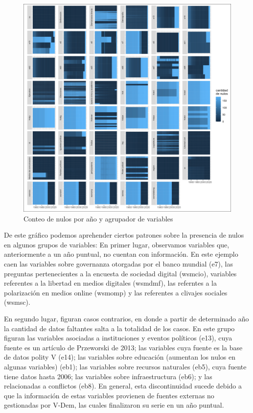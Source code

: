 \documentclass{article}
\begin{document}
\begin{figure}[H]
  \centering  
  \includegraphics[width=1\textwidth]{1_nas.png}
  \caption{Conteo de nulos por año y agrupador de variables\label{fig:nas}}
\end{figure}

De este gráfico podemos aprehender ciertos patrones sobre la presencia de nulos
en algunos grupos de variables: En primer lugar, observamos variables que,
anteriormente a un año puntual, no cuentan con información. En este ejemplo caen
las variables sobre governanza otorgadas por el banco mundial (e7), las preguntas
pertenecientes a la encuesta de sociedad digital (wsmcio), variables referentes a
la libertad en medios digitales (wsmdmf), las referntes a la polarización en medios
online (wsmomp) y las referentes a clivajes sociales (wsmsc).

En segundo lugar, figuran casos contrarios, en donde a partir de determinado año
la cantidad de datos faltantes salta a la totalidad de los casos. En este grupo
figuran las variables asociadas a instituciones y eventos políticos (e13), cuya 
fuente es un artículo de Przeworski de 2013; las variables cuya fuente es la base
de datos polity V (e14); las variables sobre educación (aumentan los nulos en 
algunas variables) (eb1); las variables sobre recursos naturales (eb5), cuya fuente 
tiene datos hasta 2006; las variables sobre infraestructura (eb6); y las relacionadas 
a conflictos (eb8). En general, esta discontinuidad sucede debido a que la 
información de estas variables provienen de fuentes externas no gestionadas por 
V-Dem, las cuales finalizaron su serie en un año puntual.
\end{document}
